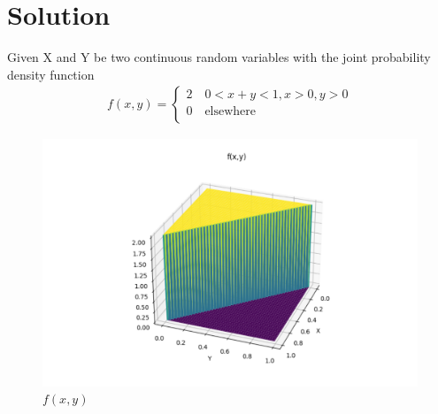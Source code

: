 \documentclass[journal,12pt,twocolumn]{IEEEtran}
\begin{document}
\section*{Solution}
Given X and Y be two continuous random variables with the joint probability density function
\begin{align}
    f\left(x,y\right)=\begin{cases}
    2 \quad  0<x+y<1 ,x>0 ,y>0\\
    0 \quad  \textrm{elsewhere}\\
    \end{cases}
\end{align}
\begin{figure}[h]
    \centering
    \includegraphics[scale=0.2]{f(x,y)_graph.png}
    \caption{$f\left(x,y\right)$}
    \label{fig:f(x,y)}
\end{figure}
\end{document}
